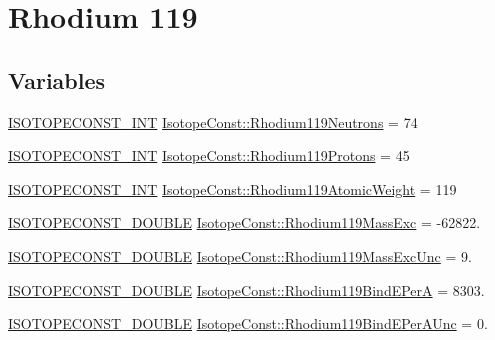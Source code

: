 \hypertarget{group___isotope_const-_rhodium-_rh119}{}\section{Rhodium 119}
\label{group___isotope_const-_rhodium-_rh119}
\subsection*{Variables}
\begin{DoxyCompactItemize}
\item 
\mbox{\hyperlink{group___isotope_const-_macros_ga5f18360b3e99483a35c32d789e62621c}{I\+S\+O\+T\+O\+P\+E\+C\+O\+N\+S\+T\+\_\+\+I\+NT}} \mbox{\hyperlink{group___isotope_const-_rhodium-_rh119_ga0ffad7bee1678389fb45d53ac6e5bce7}{Isotope\+Const\+::\+Rhodium119\+Neutrons}} = 74
\item 
\mbox{\hyperlink{group___isotope_const-_macros_ga5f18360b3e99483a35c32d789e62621c}{I\+S\+O\+T\+O\+P\+E\+C\+O\+N\+S\+T\+\_\+\+I\+NT}} \mbox{\hyperlink{group___isotope_const-_rhodium-_rh119_gae0f151efd21be45cc30f5823528565d2}{Isotope\+Const\+::\+Rhodium119\+Protons}} = 45
\item 
\mbox{\hyperlink{group___isotope_const-_macros_ga5f18360b3e99483a35c32d789e62621c}{I\+S\+O\+T\+O\+P\+E\+C\+O\+N\+S\+T\+\_\+\+I\+NT}} \mbox{\hyperlink{group___isotope_const-_rhodium-_rh119_ga122fd01f0d2ce17416e7e37d9b438476}{Isotope\+Const\+::\+Rhodium119\+Atomic\+Weight}} = 119
\item 
\mbox{\hyperlink{group___isotope_const-_macros_ga8f45a7272ce02c0b4c65c44636ed719a}{I\+S\+O\+T\+O\+P\+E\+C\+O\+N\+S\+T\+\_\+\+D\+O\+U\+B\+LE}} \mbox{\hyperlink{group___isotope_const-_rhodium-_rh119_ga271a170942c29cffa4c174e9b28ba697}{Isotope\+Const\+::\+Rhodium119\+Mass\+Exc}} = -\/62822.
\item 
\mbox{\hyperlink{group___isotope_const-_macros_ga8f45a7272ce02c0b4c65c44636ed719a}{I\+S\+O\+T\+O\+P\+E\+C\+O\+N\+S\+T\+\_\+\+D\+O\+U\+B\+LE}} \mbox{\hyperlink{group___isotope_const-_rhodium-_rh119_ga868e61a0fdcb8d17c6565fbe7c920f3d}{Isotope\+Const\+::\+Rhodium119\+Mass\+Exc\+Unc}} = 9.
\item 
\mbox{\hyperlink{group___isotope_const-_macros_ga8f45a7272ce02c0b4c65c44636ed719a}{I\+S\+O\+T\+O\+P\+E\+C\+O\+N\+S\+T\+\_\+\+D\+O\+U\+B\+LE}} \mbox{\hyperlink{group___isotope_const-_rhodium-_rh119_ga21b0aec7de7b2fe551fba627ab9eaa25}{Isotope\+Const\+::\+Rhodium119\+Bind\+E\+PerA}} = 8303.
\item 
\mbox{\hyperlink{group___isotope_const-_macros_ga8f45a7272ce02c0b4c65c44636ed719a}{I\+S\+O\+T\+O\+P\+E\+C\+O\+N\+S\+T\+\_\+\+D\+O\+U\+B\+LE}} \mbox{\hyperlink{group___isotope_const-_rhodium-_rh119_ga0a9c26a679d60add963a88db9187ab85}{Isotope\+Const\+::\+Rhodium119\+Bind\+E\+Per\+A\+Unc}} = 0.

\end{DoxyCompactItemize}
